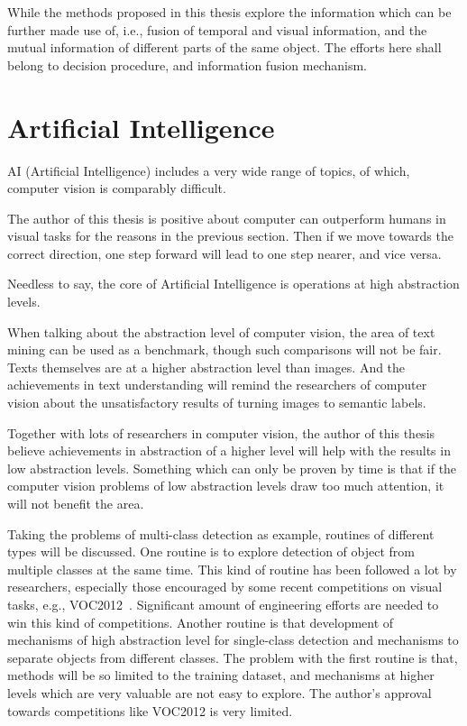While the methods proposed in this thesis explore the information which can be further made use of, i.e., fusion of temporal and visual information, and the mutual information of different parts of the same object. The efforts here shall belong to decision procedure, and information fusion mechanism.

\section{Artificial Intelligence}
AI (Artificial Intelligence) includes a very wide range of topics, of which, computer vision is comparably difficult.

The author of this thesis is positive about computer can outperform humans in visual tasks for the reasons in the previous section. Then if we move towards the correct direction, one step forward will lead to one step nearer, and vice versa.

Needless to say, the core of Artificial Intelligence is operations at high abstraction levels.

When talking about the abstraction level of computer vision, the area of text mining can be used as a benchmark, though such comparisons will not be fair. Texts themselves are at a higher abstraction level than images. And the achievements in text understanding will remind the researchers of computer vision about the unsatisfactory results of turning images to semantic labels.

Together with lots of researchers in computer vision, the author of this thesis believe achievements in abstraction of a higher level will help with the results in low abstraction levels. Something which can only be proven by time is that if the computer vision problems of low abstraction levels draw too much attention, it will not benefit the area.


Taking the problems of multi-class detection as example, routines of different types will be discussed. One routine is to explore detection of object from multiple classes at the same time. This kind of routine has been followed a lot by researchers, especially those encouraged by some recent competitions on visual tasks, e.g., VOC2012~\cite{voc}. Significant amount of engineering efforts are needed to win this kind of competitions. Another routine is that
development of mechanisms of high abstraction level for single-class detection and mechanisms to separate objects from different classes. The problem with the first routine is that, methods will be so limited to the training dataset, and mechanisms at higher levels which are very valuable are not easy to explore. The author's approval towards competitions like VOC2012 is very limited.

